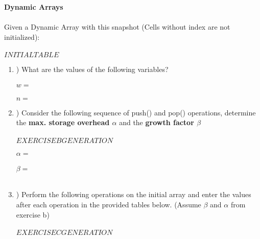 \documentclass[12pt]{article}
\begin{document}
    \textbf{\LARGE{Dynamic Arrays}}\\
    \\
    \noindent
    Given a Dynamic Array with this snapshot (Cells without index are not initialized):\\
    \\
    $INITIALTABLE$
    \begin{enumerate}[label=\alph*]
        \item \hspace{-5px}) What are the values of the following variables?\\
        \\
        $w = $\\
        \\
        $n = $
        \\
        \item \hspace{-5px}) Consider the following sequence of push() and pop() operations, determine the \textbf{max. storage overhead $\alpha$}
        and the \textbf{growth factor $\beta$}\\
        \\
        $EXERCISEBGENERATION$\\
        \\
        $\alpha = $\\
        \\
        $\beta = $\\
        \\
        \item \hspace{-5px}) Perform the following operations on the initial array and enter the values after each operation in the provided
        tables below. (Assume $\beta$ and $\alpha$ from exercise b)\\
        \\
        $EXERCISECGENERATION$
    \end{enumerate}
\end{document}

